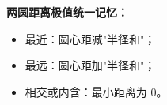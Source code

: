 \begin{summarybox}
\textbf{两圆距离极值统一记忆：}

\begin{itemize}
  \item 最近：圆心距减"半径和"；
  \item 最远：圆心距加"半径和"；
  \item 相交或内含：最小距离为 $0$。
\end{itemize}
\end{summarybox}
